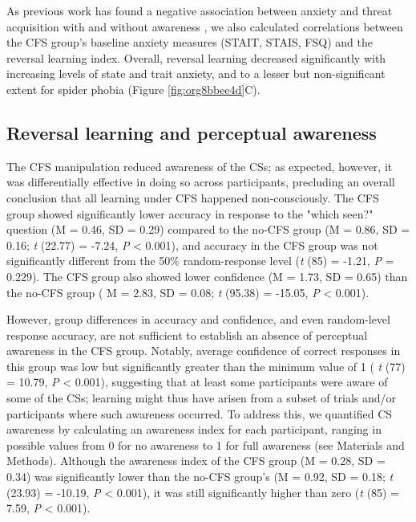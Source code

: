 \documentclass[12pt]{article}
\begin{document}
As previous work has found a negative association between anxiety and
threat acquisition with and without awareness \cite{Raio2012}, we also
calculated correlations between the CFS group's baseline anxiety
measures (STAIT, STAIS, FSQ) and the reversal learning index. Overall,
reversal learning decreased significantly with increasing levels of
state and trait anxiety, and to a lesser but non-significant extent for
spider phobia (Figure \ref{fig:org8bbee4d}C).

\subsection*{Reversal learning and perceptual awareness}
\label{sec:org24b6bb4}
The CFS manipulation reduced awareness of the CSs; as expected, however,
it was differentially effective in doing so across participants,
precluding an overall conclusion that all learning under CFS happened
non-consciously. The CFS group showed significantly lower accuracy in
response to the "which seen?" question (M = 0.46, SD = 0.29) compared to the no-CFS
group (M = 0.86, SD = 0.16; \emph{t} (22.77) = -7.24, \emph{P} < 0.001), and accuracy in the CFS group was not
significantly different from the 50\% random-response level
(\emph{t} (85) = -1.21, \emph{P} = 0.229). The CFS group also showed lower confidence
(M = 1.73, SD = 0.65) than the no-CFS group (
M = 2.83, SD = 0.08; 
\emph{t} (95.38) = -15.05, \emph{P} < 0.001).

However, group differences in accuracy and confidence, and even
random-level response accuracy, are not sufficient to establish an
absence of perceptual awareness in the CFS group. Notably, average
confidence of correct responses in this group was low but significantly
greater than the minimum value of 1 (
\emph{t} (77) = 10.79, \emph{P} < 0.001), suggesting that at least
some participants were aware of some of the CSs; learning might thus
have arisen from a subset of trials and/or participants where such
awareness occurred. To address this, we quantified CS awareness by
calculating an awareness index for each participant, ranging in possible
values from 0 for no awareness to 1 for full awareness (see Materials
and Methods). Although the awareness index of the CFS group
(M = 0.28, SD = 0.34)
was significantly lower than the no-CFS group's
(M = 0.92, SD = 0.18; \emph{t} (23.93) = -10.19, \emph{P} < 0.001), it was still significantly higher than zero
(\emph{t} (85) = 7.59, \emph{P} < 0.001).
\end{document}

